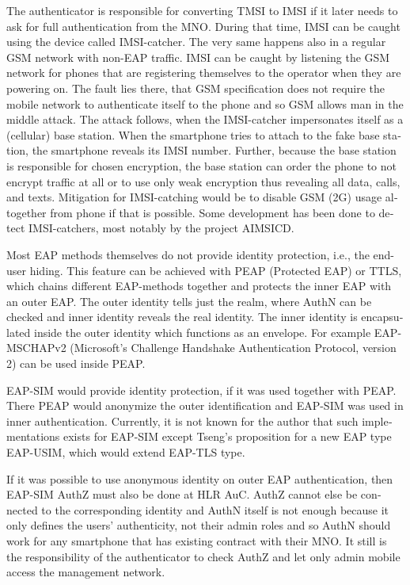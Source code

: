 \documentclass[12pt,a4paper,english]{tutthesis}
\begin{document}
\begin{otherlanguage}{english}
The authenticator is responsible for converting TMSI to IMSI if it
later needs to ask for full authentication from the MNO. During that
time, IMSI can be caught using the device called IMSI-catcher.  The
very same happens also in a regular GSM network with non-EAP traffic.
IMSI can be caught by listening the GSM network for phones that are
registering themselves to the operator when they are powering on.  The
fault lies there, that GSM specification does not require the mobile
network to authenticate itself to the phone and so GSM allows man in
the middle attack.  The attack follows, when the IMSI-catcher
impersonates itself as a (cellular) base station.  When the smartphone
tries to attach to the fake base station, the smartphone reveals its
IMSI number. Further, because the base station is responsible for
chosen encryption, the base station can order the phone to not encrypt
traffic at all or to use only weak encryption thus revealing all data,
calls, and texts. Mitigation for IMSI-catching would be to disable GSM
(2G) usage altogether from phone if that is
possible\cite{imsi-heise}. Some development has been done to detect
IMSI-catchers, most notably by the project AIMSICD\cite{aimcid}.


Most EAP methods themselves do not provide identity protection, i.e., the
end-user hiding.
This feature can be achieved with PEAP (Protected EAP) or TTLS, which
chains different EAP-methods together and protects the inner EAP with
an outer EAP. 
The outer identity tells just the realm, where AuthN can be checked
and inner identity reveals the real identity.  The inner identity is
encapsulated inside the outer identity which functions as an
envelope. 
For example EAP-MSCHAPv2 (Microsoft's Challenge
Handshake Authentication Protocol, version 2) can be used inside PEAP.


EAP-SIM would provide identity protection, if it was used together
with PEAP. There PEAP would anonymize the outer identification  and
EAP-SIM was used in inner authentication.
Currently, it is not known for the author that such implementations exists for
EAP-SIM  except Tseng's proposition\cite{tseng-usim} for a new EAP type
EAP-USIM, which would extend EAP-TLS type.

If it was possible to use anonymous identity on outer EAP
authentication, then EAP-SIM AuthZ must also be done at HLR AuC.
AuthZ cannot else be connected to the corresponding
identity and AuthN itself is not enough because it only defines the users'
authenticity, not their admin roles and so 
AuthN should work for any  smartphone that has existing contract with
their MNO. 
It still is the responsibility of the authenticator to 
check AuthZ  and let only admin mobile access the management network.


\end{otherlanguage}
\end{document}
